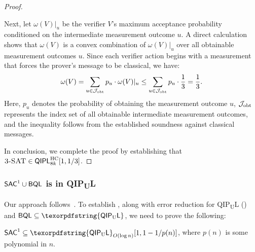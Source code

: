 \documentclass[10pt,a4paper]{article}
\numberwithin{equation}{section}
\numberwithin{figure}{section}
\newcommand{\QIPL}{\textnormal{\textsf{QIPL}}\xspace}
\newcommand{\QIPUL}{\texorpdfstring{\textnormal{\textsf{QIP}\textsubscript{\textnormal{U}}\textsf{L}}}\xspace}
\newcommand{\HC}{\mathrm{HC}}
\newcommand{\BQL}{\textnormal{\textsf{BQL}}\xspace}
\newcommand{\SAC}{\textnormal{\textsf{SAC}}\xspace}
\newcommand{\threeSAT}{\textnormal{\textsc{3-SAT}}\xspace}
\newcommand{\calJ}{\mathcal{J}}
\begin{document}
\begin{proof}
\begin{itemize}
        Next, let $\omega(V)|_u$ be the verifier $V$'s maximum acceptance probability conditioned on the intermediate measurement outcome $u$. A direct calculation shows that $\omega(V)$ is a convex combination of $\omega(V)|_u$ over all obtainable measurement outcomes $u$. Since each verifier action begins with a measurement that forces the prover's message to be classical, we have: 
        \[ \omega(V) = \sum_{u \in \calJ_{\rm obt}} p_u \cdot \omega(V)|_u \leq \sum_{u \in \calJ_{\rm obt}} p_u \cdot \frac{1}{3} = \frac{1}{3}. \]
        Here, $p_u$ denotes the probability of obtaining the measurement outcome $u$, $\calJ_{\rm obt}$ represents the index set of all obtainable intermediate measurement outcomes, and the inequality follows from the established soundness against classical messages. 
    \end{itemize}
    In conclusion, we complete the proof by establishing that $\threeSAT \in \QIPL^\HC_{8k}[1,1/3]$. 
\end{proof}

\subsubsection{\texorpdfstring{$\SAC^1 \cup \BQL$ is in \QIPUL{}}{}}
\label{subsubsec:LOGCFL-in-QIPUL}

Our approach follows~\cite[Section 3.4]{Fortnow89}. To establish , along with error reduction for \QIPUL{} () and $\BQL \subseteq \QIPUL$, we need to prove the following: 

\begin{lemma}
    \label{thm:LOGCFP-in-QIPUL-weakErrorBound}
    $\SAC^1 \subseteq \QIPUL_{O(\log{n})}[1,1-1/p(n)]$, where $p(n)$ is some polynomial in $n$.
\end{lemma}
\end{document}
